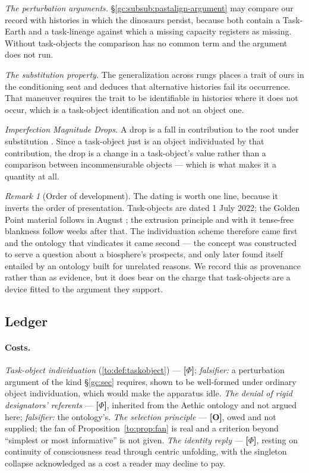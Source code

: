 \documentclass[11pt]{article}
\numberwithin{equation}{section}
\theoremstyle{plain}
\theoremstyle{definition}
\theoremstyle{remark}
\newtheorem{remark}[theorem]{Remark}
\begin{document}
\emph{The perturbation arguments.} \S\ref{gc:subsub:pastalign-argument}
may compare our record with histories in which the dinosaurs persist,
because both contain a Task-Earth and a task-lineage against which a
missing capacity registers as missing. Without task-objects the
comparison has no common term and the argument does not run.

\emph{The substitution property.} The generalization across rungs
\cite{Nexus} places a trait of ours in the conditioning seat and
deduces that alternative histories fail its occurrence. That maneuver
requires the trait to be identifiable in histories where it does not
occur, which is a task-object identification and not an object one.

\emph{Imperfection Magnitude Drops.} A drop is a fall in contribution to
the root under substitution \cite{Ben26Optimal}. Since a task-object
just is an object individuated by that contribution, the drop is a
change in a task-object's value rather than a comparison between
incommensurable objects --- which is what makes it a quantity at all.

\begin{remark}[Order of development]\label{to:rem:order}
The dating is worth one line, because it inverts the order of
presentation. Task-objects are dated 1 July 2022; the Golden Point
material follows in August \cite{GoldenScience22}; the extrusion
principle and with it tense-free blankness follow weeks after that. The
individuation scheme therefore came first and the ontology that
vindicates it came second --- the concept was constructed to serve a
question about a biosphere's prospects, and only later found itself
entailed by an ontology built for unrelated reasons. We record this as
provenance rather than as evidence, but it does bear on the charge that
task-objects are a device fitted to the argument they support.
\end{remark}

\subsection{Ledger}\label{to:sub:ledger}

\paragraph{Costs.} \emph{Task-object individuation}
(\ref{to:def:taskobject}) --- \textbf{[$\Phi$]};
\emph{falsifier:} a perturbation argument of the kind
\S\ref{gc:sec} requires, shown to be well-formed under ordinary object
individuation, which would make the apparatus idle. \emph{The denial of
rigid designators' referents} --- \textbf{[$\Phi$]}, inherited from the
Aethic ontology \cite{Aethus} and not argued here;
\emph{falsifier:} the ontology's. \emph{The selection principle} ---
\textbf{[O]}, owed and not supplied; the fan of
Proposition~\ref{to:prop:fan} is real and a criterion beyond
``simplest or most informative'' is not given. \emph{The identity reply}
--- \textbf{[$\Phi$]}, resting on continuity of consciousness read
through centric unfolding, with the singleton collapse acknowledged as
a cost a reader may decline to pay.
\end{document}
